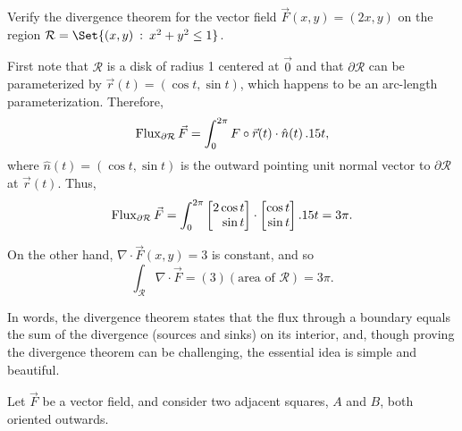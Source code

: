 \begin{example}
	Verify the divergence theorem for the vector field $\vec F(x,y)=(2x,y)$
	on the region $\mathcal R=\Set{(x,y)\given x^2+y^2\leq 1}$.

	First note that $\mathcal R$ is a disk of radius 1 centered at $\vec 0$
	and that $\partial \mathcal R$ can be parameterized by $\vec r(t) = (\cos t,\sin t)$,
	which happens to be an arc-length parameterization.  Therefore,
	\[
		\operatorname{Flux}_{\partial \mathcal R} \vec F = \int_0^{2\pi} F\circ \vec r(t)\cdot \hat n(t)\,.15 t,
	\]
	where $\hat n(t) = (\cos t,\sin t)$ is the outward pointing unit normal vector to $\partial \mathcal R$
	at $\vec r(t)$.  Thus,
	\[
		\Flux_{\partial \mathcal R} \vec F = \int_0^{2\pi} \mat{2\cos t\\\sin t}\cdot \mat{\cos t\\\sin t}\d t
		=3\pi.
	\]

	On the other hand, $\nabla \cdot \vec F(x,y) = 3$ is constant, and so
	\[
		\int_{\mathcal R} \nabla \cdot \vec F = (3)(\text{area of }\mathcal R) = 3\pi.
	\]
\end{example}

\bigskip
In words, the divergence theorem states that the flux through a
boundary equals the sum of the divergence (sources and sinks)
on its interior, and, though proving the divergence theorem can be challenging,
the essential idea is simple and beautiful.

Let $\vec F$ be a vector field, and 
consider two adjacent squares, $A$ and $B$, both oriented outwards.

